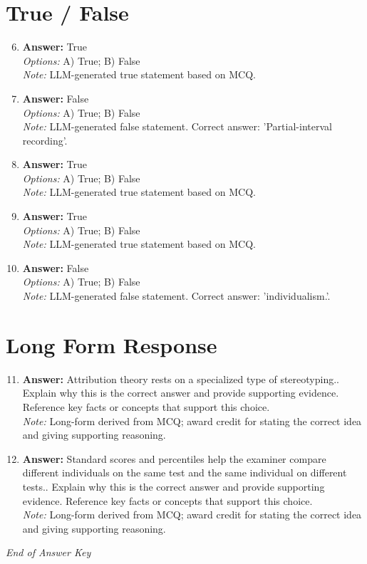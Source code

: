 \documentclass[12pt]{article}
\begin{document}
\section*{True / False}
\begin{enumerate}[label=\arabic*.]
\setcounter{enumi}{5}
\item \textbf{Answer:} True
\\ \textit{Options:} A) True; B) False
\\ \textit{Note:} LLM-generated true statement based on MCQ.
\item \textbf{Answer:} False
\\ \textit{Options:} A) True; B) False
\\ \textit{Note:} LLM-generated false statement. Correct answer: 'Partial-interval recording'.
\item \textbf{Answer:} True
\\ \textit{Options:} A) True; B) False
\\ \textit{Note:} LLM-generated true statement based on MCQ.
\item \textbf{Answer:} True
\\ \textit{Options:} A) True; B) False
\\ \textit{Note:} LLM-generated true statement based on MCQ.
\item \textbf{Answer:} False
\\ \textit{Options:} A) True; B) False
\\ \textit{Note:} LLM-generated false statement. Correct answer: 'individualism.'.
\end{enumerate}

\section*{Long Form Response}
\begin{enumerate}[label=\arabic*.]
\setcounter{enumi}{10}
\item \textbf{Answer:} Attribution theory rests on a specialized type of stereotyping.. Explain why this is the correct answer and provide supporting evidence. Reference key facts or concepts that support this choice.
\\ \textit{Note:} Long-form derived from MCQ; award credit for stating the correct idea and giving supporting reasoning.
\item \textbf{Answer:} Standard scores and percentiles help the examiner compare different individuals on the same test and the same individual on different tests.. Explain why this is the correct answer and provide supporting evidence. Reference key facts or concepts that support this choice.
\\ \textit{Note:} Long-form derived from MCQ; award credit for stating the correct idea and giving supporting reasoning.
\end{enumerate}

\vfill
\noindent\textit{End of Answer Key}
\end{document}
